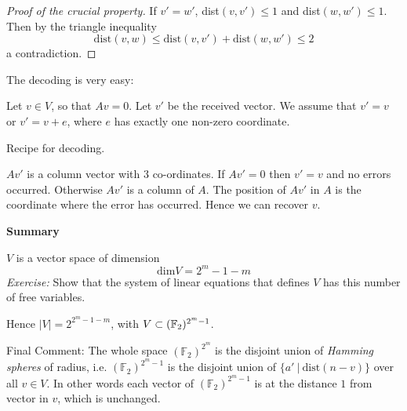 \documentclass[10pt]{scrartcl}
\begin{document}
\begin{proof}[Proof of the crucial property]
If $v' = w'$, dist$(v,v') \leq 1$ and dist$(w,w') \leq 1$. Then by the triangle inequality
\[
  \mathrm{dist}(v,w) \leq \mathrm{dist}(v,v') + \mathrm{dist}(w,w') \leq 2
\]
a contradiction.
\end{proof}


The decoding is very easy: 

Let $v \in V$, so that $Av = 0$. Let $v'$ be the received vector. We assume that $v' = v$ or $v' = v + e$, where $e$ has exactly one non-zero coordinate. 

Recipe for decoding. 

$Av'$ is a column vector with $3$ co-ordinates. If $Av' = 0$ then $v' = v$ and no errors occurred. Otherwise $Av'$ is a column of $A$. The position of $Av'$ in $A$ is the coordinate where the error has occurred. Hence we can recover $v$.

\textbf{Summary} 

$V$ is a vector space of dimension 
\[
  \mathrm{dim}V = 2^m - 1 - m
\]
\emph{Exercise:} Show that the system of linear equations that defines $V$ has this number of free variables. 

Hence $|V| = 2^{2^m - 1- m}$, with $V \subset (\mathbb{F}_2)^{2^m-1}$.




Final Comment: The whole space $(\mathbb{F}_2)^{2^m}$ is the disjoint union of \emph{Hamming spheres} of radius, i.e. $(\mathbb{F}_2)^{2^m-1}$ is the disjoint union of $\{a' ~|~ \mathrm{dist}(n-v)\}$ over all $v \in V$. In other words each vector of $(\mathbb{F}_2)^{2^m-1}$ is at the distance $1$ from vector in $v$, which is unchanged. %

\theend
%

\pagebreak
\end{document}
